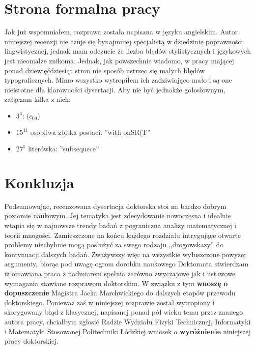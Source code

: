 \documentclass[12pt]{article}
\begin{document}
\section{Strona formalna pracy}

Jak już wspomniałem, rozprawa została napisana w języku angielskim. 
Autor niniejszej recenzji nie czuje się
bynajmniej specjalistą w dziedzinie poprawności lingwistycznej, jednak
mam odczucie że liczba błędów stylistycznych i językowych jest 
nieomalże znikoma. Jednak, jak powszechnie wiadomo, w pracy mającej ponad dziewięćdziesiąt
stron nie sposób ustrzec się małych błędów typograficznych. Mimo
wszystko wytropiłem ich zadziwiająco mało i są one 
nieistotne dla klarowności dysertacji. Aby nie być 
jednakże gołosłownym, załączam kilka z nich:

\begin{itemize}
\item
  $3^4$: ($c_{00}$)
\item 
  $15^{11}$ osobliwa zbitka postaci: ''with onSR(T''
\item
  $27^5$ literówka: ''subsequece''
\end{itemize}

\section{Konkluzja}
Podsumowując, recenzowana dysertacja doktorska stoi
na bardzo dobrym poziomie naukowym. Jej tematyka jest
zdecydowanie nowoczesna i idealnie wtapia się w najnowsze
trendy badań z pograniczna analizy matematycznej i teorii mnogości.
Zamieszczone na końcu każdego rozdziału intrygujące otwarte problemy
niechybnie mogą posłużyć za swego rodzaju ,,drogowskazy'' 
do kontynuacji dalszych badań.
  Zważywszy więc na wszystkie wyłuszczone powyżej argumenty,
biorąc pod uwagę ogrom dorobku naukowego Doktoranta 
stwierdzam iż omawiana 
praca z nadmiarem spełnia zarówno zwyczajowe jak i ustawowe
wymagania stawiane rozprawom doktorskim. W związku z tym
{\bf wnoszę o dopuszczenie} Magistra Jacka Marchwickiego do dalszych
etapów przewodu doktorskiego.
  Ponieważ zaś w niniejszej rozprawie został wytropiony i 
skorygowany błąd z klasycznej, napisanej ponad pół wieku temu przez znanego
autora pracy, chciałbym zgłosić Radzie Wydziału Fizyki 
Technicznej, Informatyki i Matematyki Stosowanej Politechniki
Łódzkiej wniosek o {\bf wyróżnienie} niniejszej pracy doktorskiej.
\end{document}
